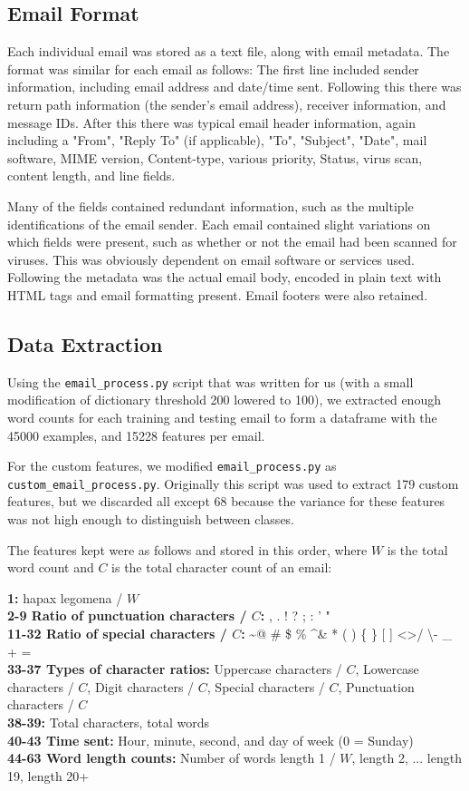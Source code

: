 \documentclass{article} %
\begin{document}
\subsection*{Email Format}
Each individual email was stored as a text file, along with email metadata. The format was similar for each email as follows: The first line included sender information, including email address and date/time sent. Following this there was return path information (the sender's email address), receiver information, and message IDs.  After this there was typical email header information, again including a "From", "Reply To" (if applicable), "To", "Subject", "Date", mail software, MIME version, Content-type, various priority, Status, virus scan, content length, and line fields.\par
Many of the fields contained redundant information, such as the multiple identifications of the email sender. Each email contained slight variations on which fields were present, such as whether or not the email had been scanned for viruses. This was obviously dependent on email software or services used.  Following the metadata was the actual email body, encoded in plain text with HTML tags and email formatting present. Email footers were also retained.

\subsection*{Data Extraction}
\par
Using the  \lstinline{email_process.py}\lstinline{} script that was written for us (with a small modification of dictionary threshold 200 lowered to 100), we extracted enough word counts for each training and testing email to form a dataframe with the 45000 examples, and 15228 features per email.\par 
For the custom features, we modified \lstinline|email_process.py| as \lstinline|custom_email_process.py|. Originally this script was used to extract 179 custom features, but we discarded all except 68 because the variance for these features was not high enough to distinguish between classes. \par
The features kept were as follows and stored in this order, where $W$ is the total word count and $C$ is the total character count of an email:\par 
\textbf{1:} hapax legomena / $W$\\
\textbf{2-9 Ratio of punctuation characters / $C$: }  , . ! ? ; : ' "\\
\textbf{11-32 Ratio of special characters / $C$:} \textasciitilde @ \# \$ \% \textasciicircum \& * ( ) \{ \} [ ] \textless \textgreater / \textbackslash - \_ + =\\
\textbf{33-37 Types of character ratios:} Uppercase characters / $C$, Lowercase characters / $C$, Digit characters / $C$, Special characters / $C$, Punctuation characters / $C$\\
\textbf{38-39:} Total characters, total words\\
\textbf{40-43 Time sent: } Hour, minute, second, and day of week (0 = Sunday)\\
\textbf{44-63 Word length counts:} Number of words length 1 / $W$, length 2, ... length 19, length 20+
\end{document}

